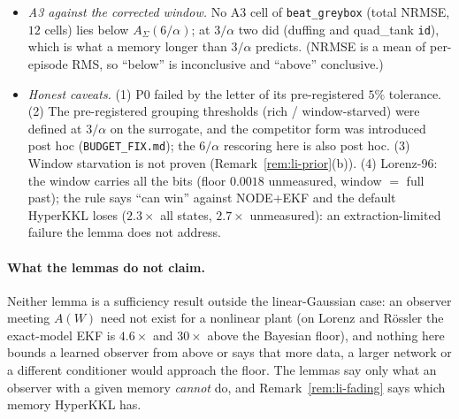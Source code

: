 \begin{itemize}[leftmargin=1.5em]
(CLAIMS\_v3\_draft.md, Disclosure 7); with a smaller $\varepsilon$ more pairs become ``cannot'', so the rule must be re-scored.
\item \emph{A3 against the corrected window.} No A3 cell of \texttt{beat\_greybox} (total NRMSE, $12$ cells) lies below
$A_\Sigma(6/\alpha)$; at $3/\alpha$ two did (duffing and quad\_tank \texttt{id}), which is what a memory longer than $3/\alpha$
predicts. (NRMSE is a mean of per-episode RMS, so ``below'' is inconclusive and ``above'' conclusive.)
\item \emph{Honest caveats.} (1) P0 failed by the letter of its pre-registered $5\%$ tolerance. (2) The pre-registered
grouping thresholds (rich / window-starved) were defined at $3/\alpha$ on the surrogate, and the competitor form was
introduced post hoc (\texttt{BUDGET\_FIX.md}); the $6/\alpha$ rescoring here is also post hoc. (3) Window starvation is not
proven (Remark~\ref{rem:li-prior}(b)). (4) Lorenz-96: the window carries all the bits (floor $0.0018$ unmeasured,
window $=$ full past); the rule says ``can win'' against NODE+EKF and the default HyperKKL loses ($2.3\times$ all states,
$2.7\times$ unmeasured): an extraction-limited failure the lemma does not address.
\end{itemize}

\paragraph{What the lemmas do not claim.} Neither lemma is a sufficiency result outside the linear-Gaussian case:
an observer meeting $A(W)$ need not exist for a nonlinear plant (on Lorenz and R\"ossler the exact-model EKF is
$4.6\times$ and $30\times$ above the Bayesian floor), and nothing here bounds a learned observer from above or says
that more data, a larger network or a different conditioner would approach the floor. The lemmas say only what an
observer with a given memory \emph{cannot} do, and Remark~\ref{rem:li-fading} says which memory HyperKKL has.

